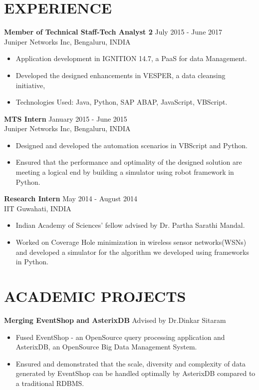 \documentclass[margin]{res}
\begin{document}
\begin{resume}
\section{EXPERIENCE}

\textbf{Member of Technical Staff-Tech Analyst 2} \hfill July 2015 - June 2017 \\
Juniper Networks Inc, Bengaluru, INDIA
\begin{itemize}
\item Application development in IGNITION 14.7, a PaaS for data Management.
\item Developed the designed enhancements in VESPER, a data cleansing initiative, 
\item Technologies Used: Java, Python, SAP ABAP, JavaScript, VBScript. 
\end{itemize} 

\textbf{MTS Intern} \hfill January 2015 - June 2015 \\
Juniper Networks Inc, Bengaluru, INDIA 
\begin{itemize} \itemsep -2pt %
\item Designed and developed the automation scenarios in VBScript and Python.
\item Ensured that the performance and optimality of the designed solution are meeting a logical end by building a simulator using robot framework in Python.
\end{itemize}
 
\textbf{Research Intern} \hfill May 2014 - August 2014\\
IIT Guwahati, INDIA
\begin{itemize} 
\item Indian Academy of Sciences' fellow advised by Dr. Partha Sarathi Mandal.
\item Worked on Coverage Hole minimization in wireless sensor networks(WSNs) and developed a simulator for the algorithm we developed using frameworks in Python.
\end{itemize} 


\section{ACADEMIC PROJECTS}
\textbf{Merging EventShop and AsterixDB}  \hfill Advised by Dr.Dinkar Sitaram
\begin{itemize} 
\item Fused EventShop - an OpenSource query processing application and AsterixDB, an OpenSource Big Data Management System.
\item Ensured and demonstrated that the scale, diversity and complexity of data generated by EventShop can be handled optimally by AsterixDB compared to a traditional RDBMS.
\end{itemize}


\end{resume}
\end{document}
